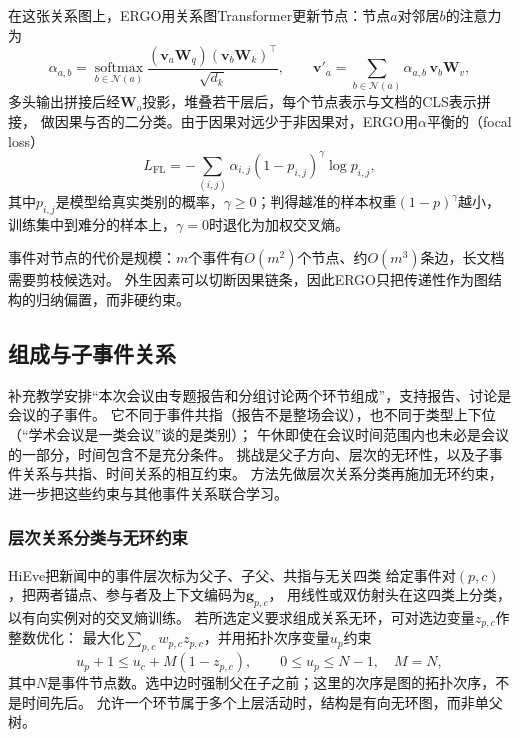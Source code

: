 在这张关系图上，ERGO用关系图Transformer更新节点：节点$a$对邻居$b$的注意力为
\begin{equation}
  \alpha_{a,b}=\operatorname*{softmax}_{b\in\mathcal{N}(a)}
  \frac{(\bm{v}_a\bm{W}_q)(\bm{v}_b\bm{W}_k)^{\top}}{\sqrt{d_k}},\qquad
  \bm{v}'_a=\sum_{b\in\mathcal{N}(a)}\alpha_{a,b}\,\bm{v}_b\bm{W}_v,
  \label{eq:nlp-extraction-ergo-attention}
\end{equation}
多头输出拼接后经$\bm{W}_o$投影，堆叠若干层后，每个节点表示与文档的CLS表示拼接，
做因果与否的二分类。由于因果对远少于非因果对，ERGO用$\alpha$平衡的（focal loss）
\begin{equation}
  L_{\mathrm{FL}}=-\sum_{(i,j)}\alpha_{i,j}(1-p_{i,j})^{\gamma}\log p_{i,j},
  \label{eq:nlp-extraction-focal}
\end{equation}
其中$p_{i,j}$是模型给真实类别的概率，$\gamma\geq0$；判得越准的样本权重$(1-p)^{\gamma}$越小，
训练集中到难分的样本上，$\gamma=0$时退化为加权交叉熵。

事件对节点的代价是规模：$m$个事件有$O(m^2)$个节点、约$O(m^3)$条边，长文档需要剪枝候选对。
外生因素可以切断因果链条，因此ERGO只把传递性作为图结构的归纳偏置，而非硬约束。

\subsection{组成与子事件关系}
\label{sec:nlp-extraction-subevents}

补充教学安排“本次会议由专题报告和分组讨论两个环节组成”，支持报告、讨论是会议的子事件。
它不同于事件共指（报告不是整场会议），也不同于类型上下位（“学术会议是一类会议”谈的是类别）；
午休即使在会议时间范围内也未必是会议的一部分，时间包含不是充分条件。
挑战是父子方向、层次的无环性，以及子事件关系与共指、时间关系的相互约束。
方法先做层次关系分类再施加无环约束，进一步把这些约束与其他事件关系联合学习。

\subsubsection{层次关系分类与无环约束}
\label{sec:nlp-extraction-subevent-acyclic}

HiEve把新闻中的事件层次标为父子、子父、共指与无关四类
给定事件对$(p,c)$，把两者锚点、参与者及上下文编码为$\bm{g}_{p,c}$，
用线性或双仿射头在这四类上分类，以有向实例对的交叉熵训练。
若所选定义要求组成关系无环，可对选边变量$z_{p,c}$作整数优化：
最大化$\sum_{p,c}w_{p,c}z_{p,c}$，并用拓扑次序变量$u_p$约束
\begin{equation}
  u_p+1\leq u_c+M(1-z_{p,c}),\qquad
  0\leq u_p\leq N-1,\quad M=N,
  \label{eq:nlp-extraction-subevent-ilp}
\end{equation}
其中$N$是事件节点数。选中边时强制父在子之前；这里的次序是图的拓扑次序，不是时间先后。
允许一个环节属于多个上层活动时，结构是有向无环图，而非单父树。


